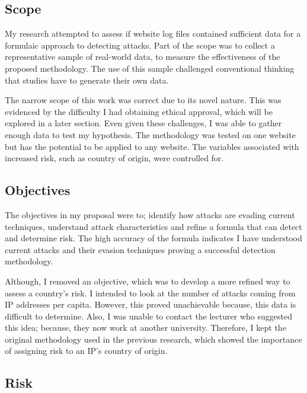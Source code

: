 \subsection{Scope}

My research attempted to assess if website log files contained sufficient data for a formulaic approach to detecting attacks. Part of the scope was to collect a representative sample of real-world data, to measure the effectiveness of the proposed methodology. The use of this sample challenged conventional thinking that studies have to generate their own data.

The narrow scope of this work was correct due to its novel nature. This was evidenced by the difficulty I had obtaining ethical approval, which will be explored in a later section. Even given these challenges, I was able to gather enough data to test my hypothesis. The methodology was tested on one website but has the potential to be applied to any website. The variables associated with increased risk, such as country of origin, were controlled for. 




\subsection{Objectives}

The objectives in my proposal were to; identify how attacks are evading current techniques, understand attack characteristics and refine a formula that can detect and determine risk. The high accuracy of the formula indicates I have understood current attacks and their evasion techniques proving a successful detection methodology.

Although, I removed an objective, which was to develop a more refined way to assess a country's risk. I intended to look at the number of attacks coming from IP addresses per capita. However, this proved unachievable because, this data is difficult to determine. Also, I was unable to contact the lecturer who suggested this idea; because, they now work at another university. Therefore, I kept the original methodology used in the previous research, which showed the importance of assigning risk to an IP's country of origin.

\subsection{Risk}

